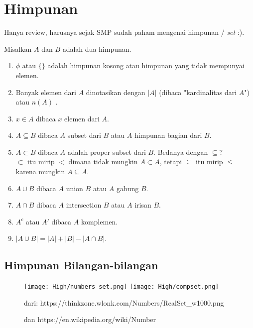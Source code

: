 \section{Himpunan}
Hanya review, harusnya sejak SMP sudah paham mengenai himpunan / \textit{set} :).

Misalkan $A$ dan $B$ adalah dua himpunan.
\begin{enumerate}
    \item $\phi$ atau $\{\}$ adalah himpunan kosong atau himpunan yang tidak mempunyai elemen.
    \item Banyak elemen dari $A$ dinotasikan dengan $|A|$ (dibaca "kardinalitas dari $A$") atau $n(A)$ .
    \item $x \in A$ dibaca $x$ elemen dari $A$.
    \item $A \subseteq B$ dibaca $A$ subset dari $B$ atau $A$ himpunan bagian dari $B$.
    \item $A \subset B$ dibaca $A$ adalah proper subset dari $B$. Bedanya dengan $\subseteq$?\\
    $\subset$ itu mirip $<$ dimana tidak mungkin $A \subset A$, tetapi $\subseteq$ itu mirip $\le$ karena mungkin $A \subseteq A$.
    \item $A \cup B$ dibaca $A$ union $B$ atau $A$ gabung $B$.
    \item $A \cap B$ dibaca $A$ intersection $B$ atau $A$ irisan $B$.
    \item $A^c$ atau $A'$ dibaca $A$ komplemen.
    \item $|A \cup B| = |A|+|B|-|A \cap B|$.
\end{enumerate}
	
\subsection{Himpunan Bilangan-bilangan}
\begin{figure}[h]
\texttt{[image: High/numbers set.png]}
\texttt{[image: High/compset.png]}
\caption{dari: https://thinkzone.wlonk.com/Numbers/RealSet\_w1000.png}
\caption{dan https://en.wikipedia.org/wiki/Number}
\end{figure}

